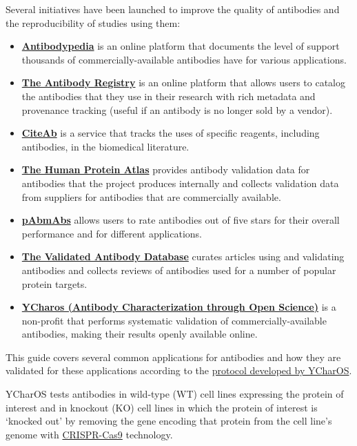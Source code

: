 \documentclass[letterpaper, 12pt]{article}
\begin{document}
Several initiatives have been launched to improve the quality of antibodies and the reproducibility of studies using them:

\begin{itemize}
    \setlength\itemsep{-0.5em}
    \item \textbf{\href{https://www.antibodypedia.com/}{Antibodypedia}} is an online platform that documents the level of support thousands of commercially-available antibodies have for various applications.
    \item \textbf{\href{https://www.antibodyregistry.org}{The Antibody Registry}} is an online platform that allows users to catalog the antibodies that they use in their research with rich metadata and provenance tracking (useful if an antibody is no longer sold by a vendor).
    \item \textbf{\href{https://www.citeab.com}{CiteAb}} is a service that tracks the uses of specific reagents, including antibodies, in the biomedical literature.
    \item \textbf{\href{https://www.proteinatlas.org/about/antibody+validation}{The Human Protein Atlas}} provides antibody validation data for antibodies that the project produces internally and collects validation data from suppliers for antibodies that are commercially available. 
    \item \textbf{\href{https://pabmabs.com/}{pAbmAbs}} allows users to rate antibodies out of five stars for their overall performance and for different applications.
    \item \textbf{\href{https://www.labome.com/index.html}{The Validated Antibody Database}} curates articles using and validating antibodies and collects reviews of antibodies used for a number of popular protein targets.
    \item \textbf{\href{https://ycharos.com/}{YCharos (Antibody Characterization through Open Science)}} is a non-profit that performs systematic validation of commercially-available antibodies, making their results openly available online.
\end{itemize}

This guide covers several common applications for antibodies and how they are validated for these applications according to the \href{https://doi.org/10.1038/s41596-024-01095-8}{protocol developed by YCharOS}. 

YCharOS tests antibodies in wild-type (WT) cell lines expressing the protein of interest and in knockout (KO) cell lines in which the protein of interest is `knocked out' by removing the gene encoding that protein from the cell line's genome with \href{https://en.wikipedia.org/wiki/CRISPR_gene_editing}{CRISPR-Cas9} technology.
\end{document}
